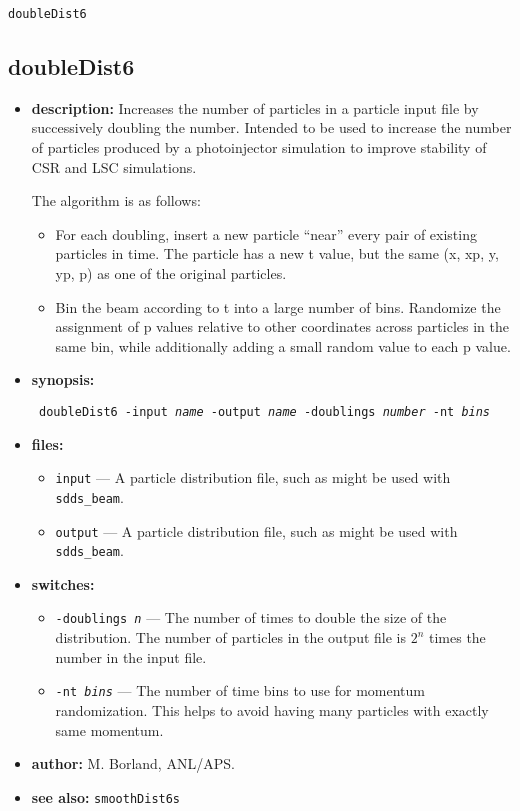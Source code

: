 \documentclass[11pt]{article}
\begin{document}
\begin{latexonly}
\newpage
\begin{center}{\Large\verb|doubleDist6|}\end{center}
\end{latexonly}
\subsection{doubleDist6}

\begin{itemize}
\item {\bf description:} Increases the number of particles in a particle input file by
 successively doubling the number.  Intended to be used to increase the number of particles
 produced by a photoinjector simulation to improve stability of CSR and LSC simulations.

The algorithm is as follows:
\begin{itemize}
\item For each doubling, insert a new particle ``near'' every pair of existing particles in time.
    The particle has a new t value, but the same (x, xp, y, yp, p) as one of the original particles.
\item Bin the beam according to t into a large number of bins.  Randomize the assignment of p values
    relative to other coordinates across particles in the same bin, while additionally adding a 
    small random value to each p value.
\end{itemize}

\item {\bf synopsis:}
\begin{flushleft}{\tt
doubleDist6 -input {\em name} -output {\em name} -doublings {\em number} -nt {\em bins}
}\end{flushleft}

\item {\bf files:}
\begin{itemize}
\item {\tt input} --- A particle distribution file, such as might be used with \verb|sdds_beam|.
\item {\tt output} --- A particle distribution file, such as might be used with \verb|sdds_beam|.
\end{itemize}

\item {\bf switches:}
\begin{itemize}
\item {\tt -doublings {\em n}} --- The number of times to double the size of the distribution.
 The number of particles in the output file is $2^n$ times the number in the input file.
\item {\tt -nt {\em bins}} --- The number of time bins to use for momentum randomization. This
 helps to avoid having many particles with exactly same momentum.
\end{itemize}

\item {\bf author:} M. Borland, ANL/APS.

\item {\bf see also:} {\tt smoothDist6s}
\end{itemize}
\end{document}
